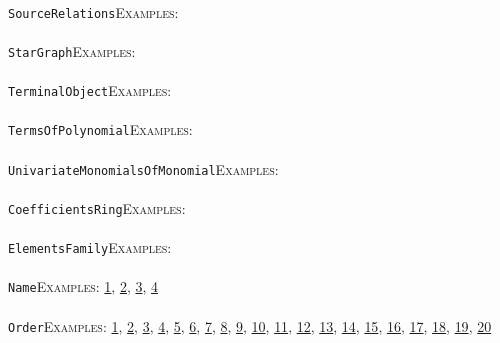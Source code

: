 \documentclass[a4paper,11pt]{report}
\begin{document}
{{ \\
 \texttt{SourceRelations}{\nobreakspace}{\nobreakspace}{\nobreakspace}{\nobreakspace}\textsc{Examples:} \\
 \\
 \texttt{StarGraph}{\nobreakspace}{\nobreakspace}{\nobreakspace}{\nobreakspace}\textsc{Examples:} \\
 \\
 \texttt{TerminalObject}{\nobreakspace}{\nobreakspace}{\nobreakspace}{\nobreakspace}\textsc{Examples:} \\
 \\
 \texttt{TermsOfPolynomial}{\nobreakspace}{\nobreakspace}{\nobreakspace}{\nobreakspace}\textsc{Examples:} \\
 \\
 \texttt{UnivariateMonomialsOfMonomial}{\nobreakspace}{\nobreakspace}{\nobreakspace}{\nobreakspace}\textsc{Examples:} \\
 \\
 \texttt{CoefficientsRing}{\nobreakspace}{\nobreakspace}{\nobreakspace}{\nobreakspace}\textsc{Examples:} \\
 \\
 \texttt{ElementsFamily}{\nobreakspace}{\nobreakspace}{\nobreakspace}{\nobreakspace}\textsc{Examples:} \\
 \\
 \texttt{Name}{\nobreakspace}{\nobreakspace}{\nobreakspace}{\nobreakspace}\textsc{Examples:} \href{tutorial/chap6.html} {1}{\nobreakspace}, \href{../www/SideLinks/About/aboutAbelianCategories.html} {2}{\nobreakspace}, \href{../www/SideLinks/About/aboutGraphsOfGroups.html} {3}{\nobreakspace}, \href{../www/SideLinks/About/aboutIntro.html} {4}{\nobreakspace} \\
 \\
 \texttt{Order}{\nobreakspace}{\nobreakspace}{\nobreakspace}{\nobreakspace}\textsc{Examples:} \href{tutorial/chap3.html} {1}{\nobreakspace}, \href{tutorial/chap6.html} {2}{\nobreakspace}, \href{../www/SideLinks/About/aboutAbelianCategories.html} {3}{\nobreakspace}, \href{../www/SideLinks/About/aboutNonabelian.html} {4}{\nobreakspace}, \href{../www/SideLinks/About/aboutPeriodic.html} {5}{\nobreakspace}, \href{../www/SideLinks/About/aboutCohomologyRings.html} {6}{\nobreakspace}, \href{../www/SideLinks/About/aboutPoincareSeries.html} {7}{\nobreakspace}, \href{../www/SideLinks/About/aboutCoveringSpaces.html} {8}{\nobreakspace}, \href{../www/SideLinks/About/aboutCoverinSpaces.html} {9}{\nobreakspace}, \href{../www/SideLinks/About/aboutPolytopes.html} {10}{\nobreakspace}, \href{../www/SideLinks/About/aboutQuandles.html} {11}{\nobreakspace}, \href{../www/SideLinks/About/aboutCrossedMods.html} {12}{\nobreakspace}, \href{../www/SideLinks/About/aboutquasi.html} {13}{\nobreakspace}, \href{../www/SideLinks/About/aboutSchurMultiplier.html} {14}{\nobreakspace}, \href{../www/SideLinks/About/aboutSimplicialGroups.html} {15}{\nobreakspace}, \href{../www/SideLinks/About/aboutExtensions.html} {16}{\nobreakspace}, \href{../www/SideLinks/About/aboutSpaceGroup.html} {17}{\nobreakspace}, \href{../www/SideLinks/About/aboutSuperperfect.html} {18}{\nobreakspace}, \href{../www/SideLinks/About/aboutGouter.html} {19}{\nobreakspace}, \href{../www/SideLinks/About/aboutTensorSquare.html} {20}{\nobreakspace} \\
}}
\end{document}
